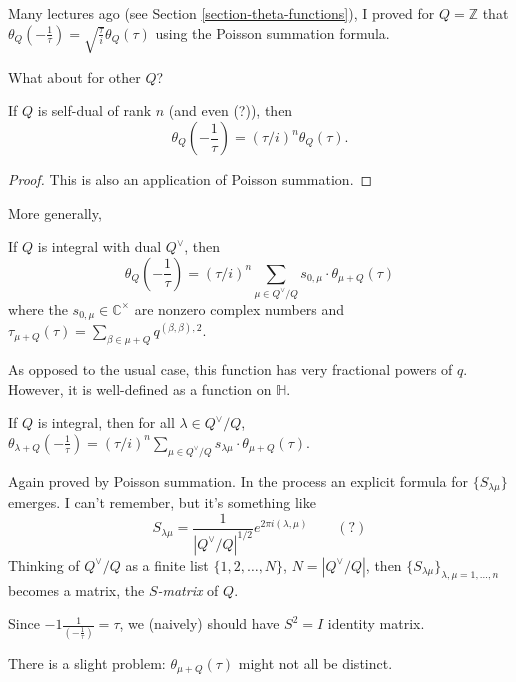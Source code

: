 \medskip\noindent
Many lectures ago
(see Section \ref{section-theta-functions}),
I proved for $Q=\mathbb{Z}$ 
that $\theta_Q\left(-\frac{1}{\tau}\right)
=\sqrt{\frac{\tau}{i}}\theta_Q(\tau)$
using the Poisson summation formula.

What about for other $Q$?

\begin{proposition}
\label{proposition-theta-function-for-self-dual-lattice}
If $Q$ is self-dual of rank $n$ (and even (?)),
then
$$
\theta_Q\left(-\frac{1}{\tau}\right)=
(\tau/i)^n\theta_Q(\tau).
$$
\end{proposition}

\begin{proof}
This is also an application of Poisson summation.
\end{proof}

\noindent
More generally,

\begin{proposition}
\label{proposition-}
If $Q$ is integral with dual $Q^\vee$,
then
$$
\theta_Q\left(-\frac{1}{\tau}\right)
=(\tau/i)^n \sum_{\mu \in Q^\vee/Q}s_{0,\mu}\cdot \theta_{\mu+Q}(\tau)
$$
where the $s_{0,\mu} \in \mathbb{C}^\times$ are nonzero complex numbers
and $\tau_{\mu+Q}(\tau)=\sum_{\beta\in\mu+Q}q^{(\beta,\beta),2}$.
\end{proposition}

\noindent
As opposed to the usual case, this function has very
fractional powers of $q$. However, it is well-defined as
a function on $\mathbb{H}$.

\begin{proposition}
\label{proposition-}
If $Q$ is integral, then for all $\lambda \in Q^\vee/Q$,
$\theta_{\lambda+Q}\left(-\frac{1}{\tau}\right)
=(\tau/i)^n \sum_{\mu \in Q^\vee/Q}s_{\lambda\mu}\cdot\theta_{\mu+Q}(\tau)$.
\end{proposition}

\noindent
Again proved by Poisson summation.
In the process an explicit formula for $\{S_{\lambda\mu}\}$ emerges.
I can't remember, but it's something like $$
S_{\lambda\mu}=\frac{1}{|Q^\vee/Q|^{1/2}}e^{2\pi i(\lambda,\mu)}
\qquad (?)
$$
Thinking of $Q^\vee/Q$ as a finite list
$\{1,2,\ldots,N\}$, $N=|Q^\vee/Q|$, then
$\{S_{\lambda\mu}\}_{\lambda,\mu=1,\ldots,n}$ becomes a matrix,
the {\it $S$-matrix} of $Q$.

Since $-1\frac{1}{\left(-\frac{1}{\tau}\right)}=\tau$,
we (naively) should have $S^2=I$ identity matrix.

There is a slight problem: $\theta_{\mu+Q}(\tau)$
might not all be distinct.

